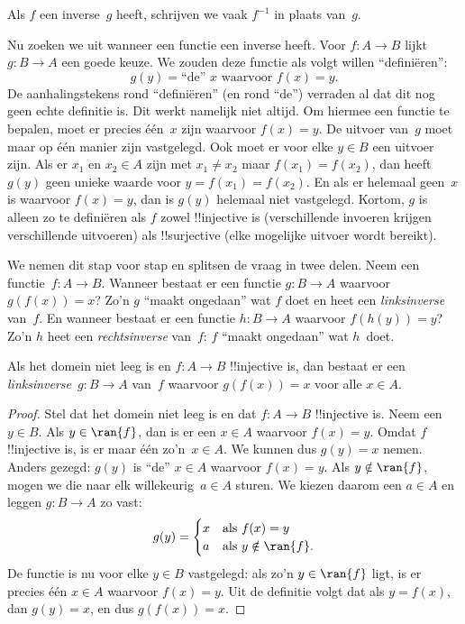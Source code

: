 \documentclass[openany]{memoir}
\begin{document}
Als $f$ een inverse~$g$ heeft, schrijven we vaak $f^{-1}$ in plaats
van~$g$.

\begin{explain}
Nu zoeken we uit wanneer een functie een inverse heeft. Voor
$f\colon A \to B$ lijkt $g\colon B \to A$ een goede keuze. We zouden
deze functie als volgt willen ``definiëren'':
\[
g(y) = \text{``de'' $x$ waarvoor $f(x) = y$.}
\]
De aanhalingstekens rond ``definiëren'' (en rond ``de'') verraden al
dat dit nog geen echte definitie is. Dit werkt namelijk niet altijd.
Om hiermee een functie te bepalen, moet er precies één~$x$ zijn
waarvoor $f(x) = y$. De uitvoer van~$g$ moet maar op één manier zijn
vastgelegd. Ook moet er voor elke $y \in B$ een uitvoer zijn. Als er
$x_1$ en $x_2 \in A$ zijn met $x_1 \neq x_2$ maar $f(x_1) = f(x_2)$,
dan heeft $g(y)$ geen unieke waarde voor $y = f(x_1) = f(x_2)$. En als
er helemaal geen~$x$ is waarvoor $f(x) = y$, dan is $g(y)$ helemaal
niet vastgelegd. Kortom, $g$ is alleen zo te definiëren als $f$ zowel
!!{injective} is (verschillende invoeren krijgen verschillende
uitvoeren) als !!{surjective} (elke mogelijke uitvoer wordt bereikt).

We nemen dit stap voor stap en splitsen de vraag in twee delen. Neem
een functie~$f\colon A \to B$. Wanneer bestaat er een functie
$g\colon B \to A$ waarvoor $g(f(x)) = x$? Zo'n $g$ ``maakt ongedaan''
wat $f$ doet en heet een \emph{linksinverse} van~$f$. En wanneer bestaat
er een functie $h\colon B \to A$ waarvoor $f(h(y)) = y$? Zo'n $h$
heet een \emph{rechtsinverse} van~$f$: $f$ ``maakt ongedaan'' wat
$h$~doet.
\end{explain}

\begin{prop}
Als het domein niet leeg is en $f\colon A \to B$ !!{injective} is, dan
bestaat er een
\emph{linksinverse}~$g\colon B \to A$ van~$f$ waarvoor $g(f(x)) = x$
voor alle $x \in A$.
\end{prop}

\begin{proof}
Stel dat het domein niet leeg is en dat $f\colon A \to B$
!!{injective} is. Neem een $y \in B$. Als
$y \in \ran{f}$, dan is er een $x \in A$ waarvoor $f(x) = y$. Omdat
$f$ !!{injective} is, is er maar één zo'n~$x \in A$. We kunnen dus
$g(y) = x$ nemen. Anders gezegd: $g(y)$ is ``de'' $x \in A$ waarvoor
$f(x) = y$. Als $y \notin \ran{f}$, mogen we die naar elk
willekeurig~$a \in A$ sturen. We kiezen daarom een $a \in A$ en leggen
$g\colon B \to A$ zo vast:
\[
g(y) = \begin{cases}
    x & \text{als $f(x) = y$}\\
    a & \text{als $y \notin \ran{f}$.}
\end{cases}
\]
De functie is nu voor elke $y \in B$ vastgelegd: als zo'n $y \in \ran{f}$
ligt, is er precies één $x \in A$ waarvoor $f(x) = y$. Uit de
definitie volgt dat als $y = f(x)$, dan $g(y) = x$, en dus
$g(f(x)) = x$.
\end{proof}
\end{document}
